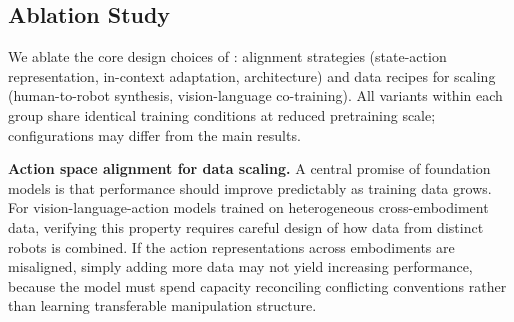 
\subsection{Ablation Study}

We ablate the core design choices of \ours: alignment strategies (state-action representation, in-context adaptation, architecture) and data recipes for scaling (human-to-robot synthesis, vision-language co-training). All variants within each group share identical training conditions at reduced pretraining scale; configurations may differ from the main results.

\textbf{Action space alignment for data scaling. } A central promise of foundation models is that performance should improve predictably as training data grows. For vision-language-action models trained on heterogeneous cross-embodiment data, verifying this property requires careful design of how data from distinct robots is combined. If the action representations across embodiments are misaligned, simply adding more data may not yield increasing performance, because the model must spend capacity reconciling conflicting conventions rather than learning transferable manipulation structure.

